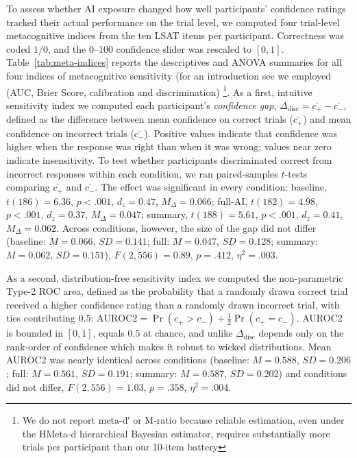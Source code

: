 \documentclass[acmlarge,review=true, anonymous=true]{acmart}
\begin{document}
To assess whether AI exposure changed how well participants' confidence ratings tracked their actual performance on the trial level, we computed four trial-level metacognitive indices from the ten LSAT items per participant. Correctness was coded $1/0$, and the 0--100 confidence slider was rescaled to $[0,1]$. Table~\ref{tab:meta-indices} reports the descriptives and ANOVA summaries for all four indices of metacognitive sensitivity (for an introduction see \citet{Rhanev}we employed (AUC, Brier Score, calibration and discrimination) \footnote{We do not report meta-d′ or M-ratio because reliable estimation, even under the HMeta-d hierarchical Bayesian estimator, requires substantially more trials per participant than our 10-item battery}. 
As a first, intuitive sensitivity index we computed each participant's
\emph{confidence gap}, $\Delta_{\text{disc}} = \overline{c_{+}} - \overline{c_{-}}$, defined as the difference between mean confidence on
correct trials ($\overline{c_{+}}$) and mean confidence on incorrect trials ($\overline{c_{-}}$). Positive values indicate that confidence
was higher when the response was right than when it was wrong; values near zero indicate insensitivity. To test whether participants
discriminated correct from incorrect responses within each condition, we ran paired-samples $t$-tests comparing $\overline{c_{+}}$ and
$\overline{c_{-}}$. The effect was significant in every condition: baseline, $t(186) = 6.36$, $p < .001$, $d_z = 0.47$, $M_{\Delta} = 0.066$; full-AI, $t(182) = 4.98$, $p < .001$, $d_z = 0.37$, $M_{\Delta} = 0.047$; summary, $t(188) = 5.61$,
$p < .001$, $d_z = 0.41$, $M_{\Delta} = 0.062$. Across conditions, however, the size of the gap did not differ (baseline: $M = 0.066$, $SD = 0.141$; full: $M = 0.047$, $SD = 0.128$; summary: $M = 0.062$, $SD = 0.151$), $F(2, 556) = 0.89$, $p = .412$, $\eta^2 = .003$.

As a second, distribution-free sensitivity index we computed the non-parametric Type-2 ROC area, defined as the probability that a randomly drawn correct trial received a higher confidence rating than a randomly drawn incorrect trial, with ties contributing $0.5$: $\mathrm{AUROC2} = \Pr(c_{+}>c_{-}) + \tfrac{1}{2}\Pr(c_{+}=c_{-})$. AUROC2 is bounded in $[0,1]$, equals $0.5$ at chance, and unlike
$\Delta_{\text{disc}}$ depends only on the rank-order of confidence which makes it robust to wicked distributions. Mean AUROC2 was nearly identical across conditions
(baseline: $M = 0.588$, $SD = 0.206$; full: $M = 0.561$, $SD = 0.191$;
summary: $M = 0.587$, $SD = 0.202$) and conditions did not differ, $F(2, 556) = 1.03$, $p = .358$, $\eta^2 = .004$.
\end{document}
